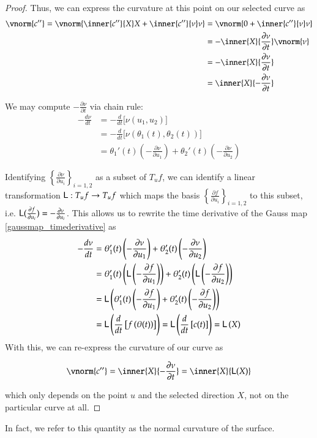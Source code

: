 \begin{proof}
		Thus, we can express the curvature at this point on our selected curve as
		\begin{align}
		\vnorm{c''} = \vnorm{\inner{c''}{X} X + \inner{c''}{\nu}\nu}
		&= \vnorm{0 + \inner{c''}{\nu}\nu} \\
		&= - \inner{X}{\frac{\partial \nu}{\partial t}}\vnorm{\nu} \\
		&= - \inner{X}{\frac{\partial \nu}{\partial t}} \\
		&=  \inner{X}{-\frac{\partial \nu}{\partial t}}
		\end{align}
		
		We may compute $-\frac{\partial \nu}{\partial t}$ via chain rule:
		\begin{align} \label{gaussmap_timederivative}
		-\frac{d \nu}{dt} &= -\frac{d}{dt}\big[\nu(u_1, u_2)\big] \\
		&= -\frac{d}{dt}\big[\nu(\theta_1(t), \theta_2(t))\big] \\
		&= \theta_1'(t)\left( - \frac{\partial \nu}{\partial u_1} \right) + 
		\theta_2'(t)\left( - \frac{\partial \nu}{\partial u_2} \right)
		\end{align}
		
		
		Identifying $\left\{ \frac{\partial \nu}{\partial u_i}\right\}_{i=1,2}$ as a subset of $T_u f$,  we can identify a linear transformation $\mathsf{L}: T_u f \to T_u f$ which maps the basis
		$\left\{ \frac{\partial f}{\partial u_i}\right\}_{i=1,2}$ to this subset, i.e.
		$\mathsf{L}(\frac{\partial f}{\partial u_i}) = - \frac{\partial \nu}{\partial u_i}$. This allows us to rewrite the time derivative of the Gauss map \cref{gaussmap_timederivative} as
			\begin{align}
			-\frac{d \nu}{dt} &= 
			\theta_1'(t)\left( - \frac{\partial \nu}{\partial u_1} \right) + 
			\theta_2'(t)\left( - \frac{\partial \nu}{\partial u_2} \right) \\
			&= \theta_1'(t)\left( \mathsf{L}\left(- \frac{\partial f}{\partial u_1}\right) \right) + 
			\theta_2'(t)\left( \mathsf{L}\left(- \frac{\partial f}{\partial u_2}\right) \right) \\
			&= \mathsf{L}\left(\theta_1'(t)\left( - \frac{\partial f}{\partial u_1}\right)  + 
			\theta_2'(t)\left( - \frac{\partial f}{\partial u_2} \right)\right) \\
			&= \mathsf{L}\left( \frac{d}{dt}\left[ f\left(\theta(t)\right)\right] \right)
			= \mathsf{L}\left( \frac{d}{dt} \left[ c(t) \right] \right) = \mathsf{L}\left(X\right)
			\end{align} 
			With this, we can re-express the curvature of our curve as
			
			\begin{equation}
			\vnorm{c''} = \inner{X}{-\frac{\partial \nu}{\partial t}} = \inner{X}{\wein(X)}
			\end{equation}
			
			which only depends on the point $u$ and the selected direction $X$, not on the particular curve at all.
		\end{proof}
		In fact, we refer to this quantity as the normal curvature of the surface. 
		
